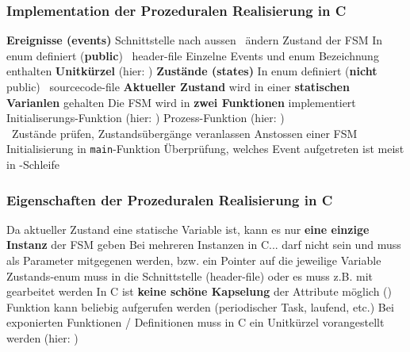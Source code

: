 \subsubsection{Implementation der Prozeduralen Realisierung in C}

\begin{outline}
    \1 \textbf{Ereignisse (events)}
        \2 Schnittstelle nach aussen \textrightarrow\ ändern Zustand der FSM
        \2 In enum definiert (\textbf{public}) \textrightarrow\ header-file
        \2 Einzelne Events und enum Bezeichnung enthalten \textbf{Unitkürzel} (hier: )
    \1 \textbf{Zustände (states)}
        \2 In enum definiert (\textbf{nicht} public) \textrightarrow\ sourcecode-file
    \1 \textbf{Aktueller Zustand} wird in einer \textbf{statischen Varianlen} gehalten
    \1 Die FSM wird in \textbf{zwei Funktionen} implementiert
        \2 Initialiserungs-Funktion (hier: )
        \2 Prozess-Funktion (hier: ) \\
            \textrightarrow\ Zustände prüfen, Zustandsübergänge veranlassen
    \1 Anstossen einer FSM
        \2 Initialisierung in \lstinline|main|-Funktion
        \2 Überprüfung, welches Event aufgetreten ist meist in -Schleife
\end{outline}

\columnbreak


\subsubsection{Eigenschaften der Prozeduralen Realisierung in C}

\begin{outline}
    \1 Da aktueller Zustand eine statische Variable ist, kann es nur \textbf{eine einzige Instanz} der FSM geben
    \1 Bei mehreren Instanzen in C...
        \2 darf  nicht  sein und muss als Parameter mitgegenen werden,
            bzw. ein Pointer auf die jeweilige Variable
        \2 Zustands-enum muss in die Schnittstelle (header-file) oder es muss z.B. mit  gearbeitet werden
    \1 In C ist \textbf{keine schöne Kapselung} der Attribute möglich ()
    \1 Funktion  kann beliebig aufgerufen werden (periodischer Task, laufend, etc.)
    \1 Bei exponierten Funktionen / Definitionen muss in C ein Unitkürzel vorangestellt werden (hier: )
\end{outline}


